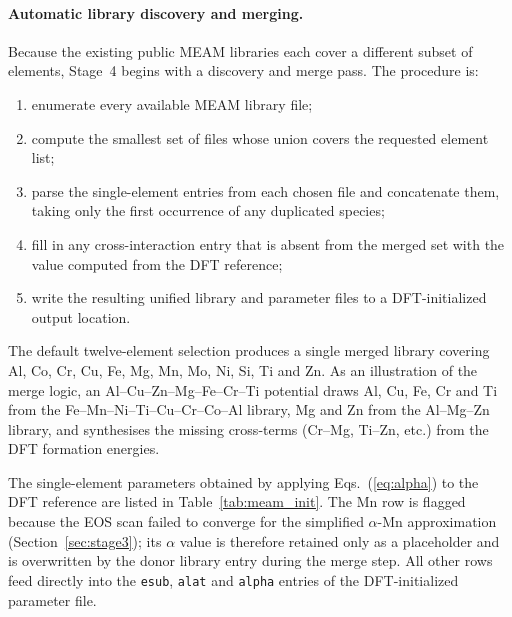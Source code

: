 \paragraph{Automatic library discovery and merging.}
Because the existing public MEAM libraries each cover a different subset of
elements, Stage~4 begins with a discovery and merge pass. The procedure is:
\begin{enumerate}
	\item enumerate every available MEAM library file;
	\item compute the smallest set of files whose union covers the
	      requested element list;
	\item parse the single-element entries from each chosen file and
	      concatenate them, taking only the first occurrence of any
	      duplicated species;
	\item fill in any cross-interaction entry that is absent from the
	      merged set with the value computed from the DFT reference;
	\item write the resulting unified library and parameter files to a
	      DFT-initialized output location.
\end{enumerate}
The default twelve-element selection produces a single merged library
covering Al, Co, Cr, Cu, Fe, Mg, Mn, Mo, Ni, Si, Ti and Zn. As an
illustration of the merge logic, an Al--Cu--Zn--Mg--Fe--Cr--Ti potential
draws Al, Cu, Fe, Cr and Ti from the Fe--Mn--Ni--Ti--Cu--Cr--Co--Al
library, Mg and Zn from the Al--Mg--Zn library, and synthesises the
missing cross-terms (Cr--Mg, Ti--Zn, etc.) from the DFT formation
energies.

The single-element parameters obtained by applying
Eqs.~(\ref{eq:alpha}) to the DFT reference are listed in
Table~\ref{tab:meam_init}. The Mn row is flagged because the EOS scan
failed to converge for the simplified $\alpha$-Mn approximation
(Section~\ref{sec:stage3}); its $\alpha$ value is therefore retained
only as a placeholder and is overwritten by the donor library entry
during the merge step. All other rows feed directly into the
\texttt{esub}, \texttt{alat} and \texttt{alpha} entries of the
DFT-initialized parameter file.


